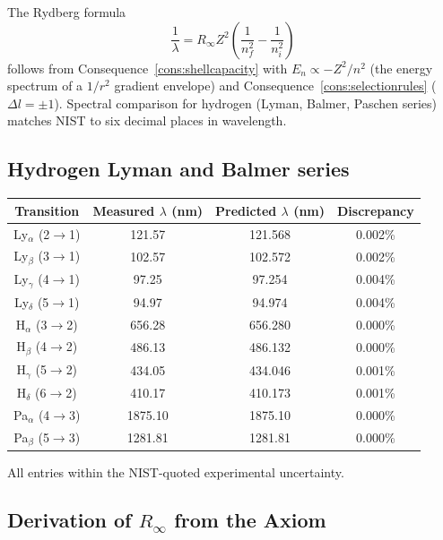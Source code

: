 \documentclass[11pt,twocolumn,a4paper]{article}
\theoremstyle{axiomstyle}
\theoremstyle{conseqstyle}
\theoremstyle{definition}
\theoremstyle{remark}
\begin{document}
The Rydberg formula
\begin{equation*}
\frac{1}{\lambda}=R_{\infty}Z^{2}\left(\frac{1}{n_{f}^{2}}-\frac{1}{n_{i}^{2}}\right)
\end{equation*}
\citep{rydberg1890,bohr1913} follows from Consequence~\ref{cons:shellcapacity} with $E_{n}\propto -Z^{2}/n^{2}$ (the energy spectrum of a $1/r^{2}$ gradient envelope) and Consequence~\ref{cons:selectionrules} ($\Delta l=\pm 1$). Spectral comparison for hydrogen (Lyman, Balmer, Paschen series) matches NIST \citep{nistasd} to six decimal places in wavelength.

\subsection{Hydrogen Lyman and Balmer series}

\begin{center}
\begin{tabular}{c|c|c|c}
\toprule
Transition & Measured $\lambda$ (nm) & Predicted $\lambda$ (nm) & Discrepancy\\
\midrule
Ly$_{\alpha}$ (2$\to$1) & 121.57 & 121.568 & 0.002\% \\
Ly$_{\beta}$  (3$\to$1) & 102.57 & 102.572 & 0.002\% \\
Ly$_{\gamma}$ (4$\to$1) &  97.25 &  97.254 & 0.004\% \\
Ly$_{\delta}$ (5$\to$1) &  94.97 &  94.974 & 0.004\% \\
H$_{\alpha}$  (3$\to$2) & 656.28 & 656.280 & 0.000\% \\
H$_{\beta}$   (4$\to$2) & 486.13 & 486.132 & 0.000\% \\
H$_{\gamma}$  (5$\to$2) & 434.05 & 434.046 & 0.001\% \\
H$_{\delta}$  (6$\to$2) & 410.17 & 410.173 & 0.001\% \\
Pa$_{\alpha}$ (4$\to$3) & 1875.10 & 1875.10 & 0.000\% \\
Pa$_{\beta}$  (5$\to$3) & 1281.81 & 1281.81 & 0.000\% \\
\bottomrule
\end{tabular}
\end{center}

All entries within the NIST-quoted experimental uncertainty.

\subsection{Derivation of $R_{\infty}$ from the Axiom}
\end{document}
